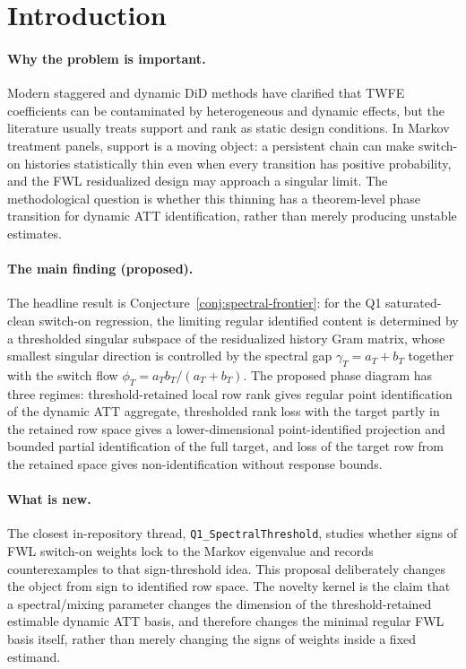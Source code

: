 \documentclass[11pt]{article}
\theoremstyle{definition}
\theoremstyle{plain}
\theoremstyle{remark}
\begin{document}
\section{Introduction}
\paragraph{Why the problem is important.}
Modern staggered and dynamic DiD methods have clarified that TWFE coefficients can be contaminated by heterogeneous and dynamic effects, but the literature usually treats support and rank as static design conditions.
In Markov treatment panels, support is a moving object: a persistent chain can make switch-on histories statistically thin even when every transition has positive probability, and the FWL residualized design may approach a singular limit.
The methodological question is whether this thinning has a theorem-level phase transition for dynamic ATT identification, rather than merely producing unstable estimates.

\paragraph{The main finding (proposed).}
The headline result is Conjecture~\ref{conj:spectral-frontier}: for the Q1 saturated-clean switch-on regression, the limiting regular identified content is determined by a thresholded singular subspace of the residualized history Gram matrix, whose smallest singular direction is controlled by the spectral gap \(\gamma_T=a_T+b_T\) together with the switch flow \(\phi_T=a_Tb_T/(a_T+b_T)\).
The proposed phase diagram has three regimes: threshold-retained local row rank gives regular point identification of the dynamic ATT aggregate, thresholded rank loss with the target partly in the retained row space gives a lower-dimensional point-identified projection and bounded partial identification of the full target, and loss of the target row from the retained space gives non-identification without response bounds.

\paragraph{What is new.}
The closest in-repository thread, \texttt{Q1\_SpectralThreshold}, studies whether signs of FWL switch-on weights lock to the Markov eigenvalue and records counterexamples to that sign-threshold idea.
This proposal deliberately changes the object from sign to identified row space.
The novelty kernel is the claim that a spectral/mixing parameter changes the dimension of the threshold-retained estimable dynamic ATT basis, and therefore changes the minimal regular FWL basis itself, rather than merely changing the signs of weights inside a fixed estimand.
\end{document}
